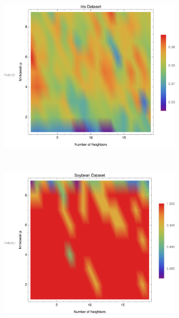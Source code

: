 \documentclass{article}
\begin{document}
\begin{figure}[h!]
\begin{subfigure}[b]{0.32\textwidth}
				\end{subfigure} \	
				\begin{subfigure}[b]{0.32\textwidth}
					\centering
					\includegraphics[width=\textwidth]{figs/kNN/iris_plot_kp}	
					\caption{}
					\label{kp_iris}				
				\end{subfigure} \	
				\begin{subfigure}[b]{0.32\textwidth}
					\centering
					\includegraphics[width=\textwidth]{figs/kNN/soybean_plot_kp}	
					\caption{}
					\label{kp_soybean}				
				\end{subfigure} \	

\end{figure}
\end{document}
